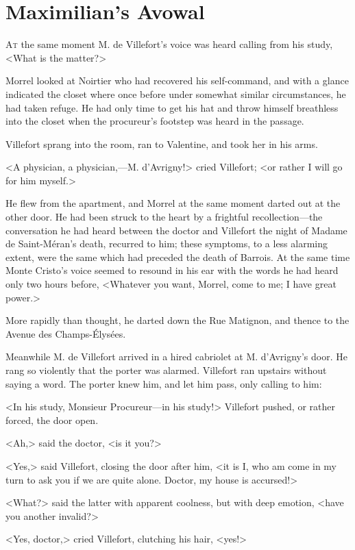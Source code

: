 \chapter{Maximilian's Avowal}

 \lettrine{A}{t} the same moment M. de Villefort's voice was heard calling from his study, <What is the matter?> 

 Morrel looked at Noirtier who had recovered his self-command, and with a glance indicated the closet where once before under somewhat similar circumstances, he had taken refuge. He had only time to get his hat and throw himself breathless into the closet when the procureur's footstep was heard in the passage. 

 Villefort sprang into the room, ran to Valentine, and took her in his arms. 

 <A physician, a physician,—M. d'Avrigny!> cried Villefort; <or rather I will go for him myself.> 

 He flew from the apartment, and Morrel at the same moment darted out at the other door. He had been struck to the heart by a frightful recollection—the conversation he had heard between the doctor and Villefort the night of Madame de Saint-Méran's death, recurred to him; these symptoms, to a less alarming extent, were the same which had preceded the death of Barrois. At the same time Monte Cristo's voice seemed to resound in his ear with the words he had heard only two hours before, <Whatever you want, Morrel, come to me; I have great power.> 

 More rapidly than thought, he darted down the Rue Matignon, and thence to the Avenue des Champs-Élysées. 

 Meanwhile M. de Villefort arrived in a hired cabriolet at M. d'Avrigny's door. He rang so violently that the porter was alarmed. Villefort ran upstairs without saying a word. The porter knew him, and let him pass, only calling to him: 

 <In his study, Monsieur Procureur—in his study!> Villefort pushed, or rather forced, the door open. 

 <Ah,> said the doctor, <is it you?> 

 <Yes,> said Villefort, closing the door after him, <it is I, who am come in my turn to ask you if we are quite alone. Doctor, my house is accursed!> 

 <What?> said the latter with apparent coolness, but with deep emotion, <have you another invalid?> 

 <Yes, doctor,> cried Villefort, clutching his hair, <yes!> 

